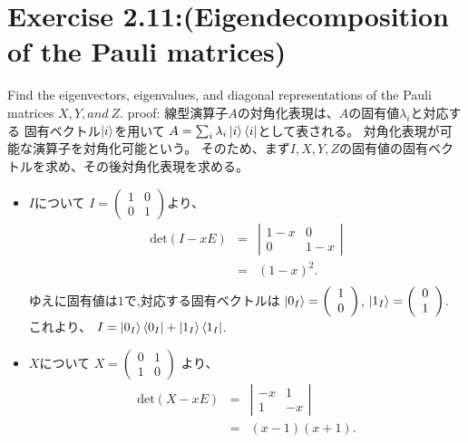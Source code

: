\section{\large Exercise 2.11:(Eigendecomposition of the Pauli matrices)}
Find the eigenvectors, eigenvalues, and diagonal representations of 
the Pauli matrices $X, Y, and~Z$.
{\large proof:}
\color{red}
線型演算子$A$の対角化表現は、$A$の固有値$\lambda_i$と対応する
固有ベクトル$\ket{i}$を用いて
$A = \sum_i \lambda_i \ket{i}\bra{i}$として表される。
対角化表現が可能な演算子を対角化可能という。
\color{black}
\newline
そのため、まず$I, X, Y, Z$の固有値の固有ベクトルを求め、その後対角化表現を求める。
\begin{itemize}
\item $I$について
$
I = \left(
	\begin{array}{cc}
	1&0\\
	0&1
	\end{array}
\right)
$より、
\begin{eqnarray*}
\mathrm{det}(I - xE) &=& \left| \begin{array}{cc}
	1-x & 0\\
	0 & 1-x
	\end{array}
	\right| \\
	&=& (1 - x)^2.\\
\end{eqnarray*}
ゆえに固有値は$1$で,対応する固有ベクトルは
$\ket{0_I} = \left( \begin{array}{c}
	1\\
	0
	\end{array}
\right)
$,
$\ket{1_I} =\left( \begin{array}{c}
	0 \\
	1
	\end{array}
\right)
$.
\newline
これより、
$I = \ket{0_I}\bra{0_I} + \ket{1_I}\bra{1_I}$.
\newline
\item $X$について
$X = \left(
	\begin{array}{cc}
	0&1\\
	1&0
	\end{array}
\right)
$
より、
\begin{eqnarray*}
\mathrm{det}(X - xE) &=& \left| \begin{array}{cc}
	-x & 1\\
	1 & -x
	\end{array}
	\right|\\
	&=& (x - 1)(x + 1). \\

\end{eqnarray*}
\end{itemize}
